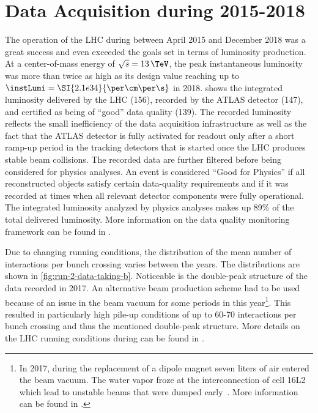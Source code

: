 \section{Data Acquisition during 2015-2018}
\label{sec:run-2-data-taking}
The operation of the LHC during \RunTwo between April 2015 and December 2018 was a great success and even exceeded the goals set in terms of luminosity production. At a center-of-mass energy of $\sqrt{s} = 13\,\TeV$, the peak instantaneous luminosity was more than twice as high as its design value reaching up to $\instLumi = \SI{2.1e34}{\per\cm\per\s}$ in 2018.
 shows the integrated luminosity delivered by the LHC (156\ifb), recorded by the ATLAS detector (147\ifb), and certified as being of ``good'' data quality (139\ifb).
The recorded luminosity reflects the small inefficiency of the data acquisition infrastructure as well as the fact that the ATLAS detector is fully activated for readout only after a short ramp-up period in the tracking detectors that is started once the LHC produces stable beam collisions.
The recorded data are further filtered before being considered for physics analyses.
An event is considered ``Good for Physics'' if all reconstructed objects satisfy certain data-quality requirements and if it was recorded at times when all relevant detector components were fully operational.
The integrated luminosity analyzed by physics analyses makes up 89\% of the total delivered luminosity.
More information on the data quality monitoring framework can be found in .

Due to changing running conditions, the distribution of the mean number of interactions per bunch crossing varies between the years.
The distributions are shown in \cref{fig:run-2-data-taking-b}.
Noticeable is the double-peak structure of the data recorded in 2017.
An alternative beam production scheme had to be used because of an issue in the beam vacuum for some periods in this year\footnote{In 2017, during the replacement of a dipole magnet seven liters of air entered the beam vacuum. The water vapor froze at the interconnection of cell 16L2 which lead to unstable beams that were dumped early~\cite{Jimenez:2646067,Salvant:2646056}. More information can be found in .}. This resulted in particularly high pile-up conditions of up to 60-70 interactions per bunch crossing and thus the mentioned double-peak structure.
More details on the LHC running conditions during \RunTwo can be found in .

